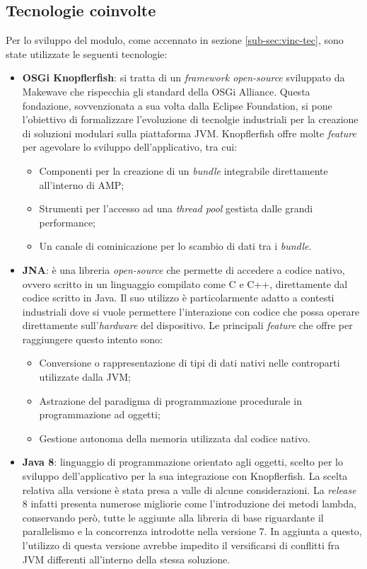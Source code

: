 \subsection{Tecnologie coinvolte}
Per lo sviluppo del modulo, come accennato in sezione \ref{sub-sec:vinc-tec}, sono state utilizzate le seguenti tecnologie:
\begin{itemize}
    \item \textbf{OSGi Knopflerfish}: si tratta di un \emph{framework open-source} sviluppato da Makewave che rispecchia gli standard della OSGi Alliance.
    Questa fondazione, sovvenzionata a sua volta dalla Eclipse Foundation, si pone l'obiettivo di formalizzare l'evoluzione di tecnolgie industriali per
    la creazione di soluzioni modulari sulla piattaforma JVM.
    Knopflerfish offre molte \emph{feature} per agevolare lo sviluppo dell'applicativo, tra cui:
    \begin{itemize}
        \item Componenti per la creazione di un \emph{bundle} integrabile direttamente all'interno di AMP;
        \item Strumenti per l'accesso ad una \emph{thread pool} gestista dalle grandi performance;
        \item Un canale di cominicazione per lo scambio di dati tra i \emph{bundle}.
    \end{itemize}
    \item \textbf{JNA}: è una libreria \emph{open-source} che permette di accedere a codice nativo, ovvero scritto in un linguaggio compilato come C e C++, 
    direttamente dal codice scritto in Java. Il suo utilizzo è particolarmente adatto a contesti industriali dove si vuole permettere l'interazione con
    codice che possa operare direttamente sull'\emph{hardware} del dispositivo.
    Le principali \emph{feature} che offre per raggiungere questo intento sono:
    \begin{itemize}
        \item Conversione o rappresentazione di tipi di dati nativi nelle controparti utilizzate dalla JVM;
        \item Astrazione del paradigma di programmazione procedurale in programmazione ad oggetti;
        \item Gestione autonoma della memoria utilizzata dal codice nativo.  
    \end{itemize}
    \item \textbf{Java 8}: linguaggio di programmazione orientato agli oggetti, scelto per lo sviluppo dell'applicativo per la sua integrazione con 
    Knopflerfish. La scelta relativa alla versione è stata presa a valle di alcune considerazioni. La \emph{release} 8 infatti presenta numerose migliorie
    come l'introduzione dei metodi lambda, conservando però, tutte le aggiunte alla libreria di base riguardante il parallelismo e la concorrenza introdotte
    nella versione 7. In aggiunta a questo, l'utilizzo di questa versione avrebbe impedito il versificarsi di conflitti fra JVM differenti all'interno della
    stessa soluzione.
\end{itemize}

